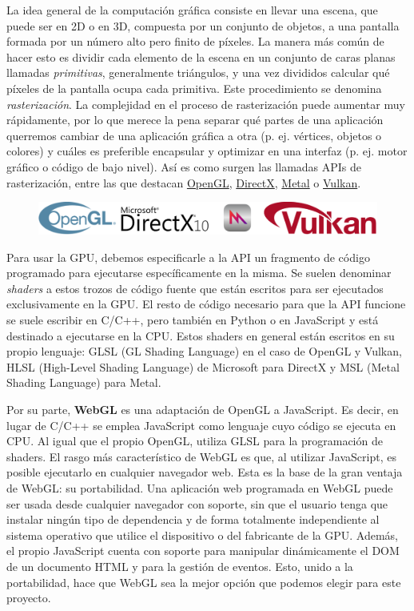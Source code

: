 La idea general de la computación gráfica consiste en llevar una escena, que puede ser en 2D o en 3D, compuesta por un conjunto de objetos, a una pantalla formada por un número alto pero finito de píxeles. La manera más común de hacer esto es dividir cada elemento de la escena en un conjunto de caras planas llamadas \textit{primitivas}, generalmente triángulos, y una vez divididos calcular qué píxeles de la pantalla ocupa cada primitiva. Este procedimiento se denomina \textit{rasterización}. La complejidad en el proceso de rasterización puede aumentar muy rápidamente, por lo que merece la pena separar qué partes de una aplicación querremos cambiar de una aplicación gráfica a otra (p. ej. vértices, objetos o colores) y cuáles es preferible encapsular y optimizar en una interfaz (p. ej. motor gráfico o código de bajo nivel). Así es como surgen las llamadas APIs de rasterización, entre las que destacan \textcolor{blue}{\href{https://www.opengl.org/}{OpenGL}}, \textcolor{blue}{\href{https://www.microsoft.com/es-es/download/details.aspx?id=35}{DirectX}}, \textcolor{blue}{\href{https://developer.apple.com/metal/}{Metal}} o \textcolor{blue}{\href{https://www.vulkan.org/}{Vulkan}}.

\begin{figure} [ht]
    \centering
    \includegraphics[scale = 0.3]{img/C5/APis.png}
\end{figure}

Para usar la GPU, debemos especificarle a la API un fragmento de código programado para ejecutarse específicamente en la misma. Se suelen denominar \textit{shaders} a estos trozos de código fuente que están escritos para ser ejecutados exclusivamente en la GPU. El resto de código necesario para que la API funcione se suele escribir en C/C++, pero también en Python o en JavaScript y está destinado a ejecutarse en la CPU. Estos shaders en general están escritos en su propio lenguaje: GLSL (GL Shading Language) en el caso de OpenGL y Vulkan, HLSL (High-Level Shading Language) de Microsoft para DirectX y MSL (Metal Shading Language) para Metal. 

Por su parte, \textbf{WebGL} es una adaptación de OpenGL a JavaScript. Es decir, en lugar de C/C++ se emplea JavaScript como lenguaje cuyo código se ejecuta en CPU. Al igual que el propio OpenGL, utiliza GLSL para la programación de shaders. El rasgo más característico de WebGL es que, al utilizar JavaScript, es posible ejecutarlo en cualquier navegador web. Esta es la base de la gran ventaja de WebGL: su portabilidad. Una aplicación web programada en WebGL puede ser usada desde cualquier navegador con soporte, sin que el usuario tenga que instalar ningún tipo de dependencia y de forma totalmente independiente al sistema operativo que utilice el dispositivo o del fabricante de la GPU. Además, el propio JavaScript cuenta con soporte para manipular dinámicamente el DOM de un documento HTML y para la gestión de eventos. Esto, unido a la portabilidad, hace que WebGL sea la mejor opción que podemos elegir para este proyecto.

